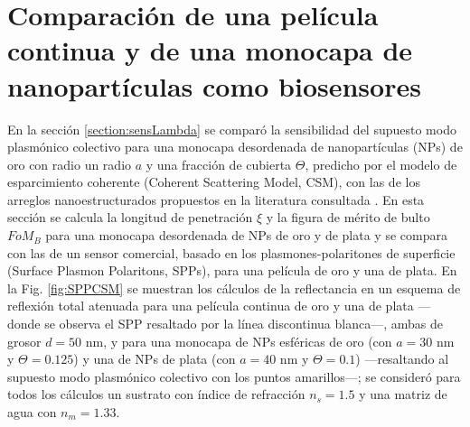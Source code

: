 \chapter{Comparación de una película continua y de una monocapa de nanopartículas como biosensores}

\label{section:A1}

En la sección \ref{section:sensLambda} se comparó la sensibilidad del supuesto modo plasmónico colectivo para una monocapa desordenada de nanopartículas (NPs) de oro con radio un radio $a$ y una fracción de cubierta $\Theta$, predicho por el modelo de esparcimiento coherente (Coherent Scattering Model, CSM), con las de los arreglos nanoestructurados propuestos en la literatura consultada \cite{danilov2018ultra,svedendahl2009refractometric}. En esta sección se calcula  la longitud de penetración $\xi$ y la figura de mérito de bulto $\textit{FoM}_B$ para una monocapa desordenada de NPs  de oro y de plata y se compara con las de un sensor comercial, basado en los plasmones-polaritones de superficie (Surface Plasmon Polaritons, SPPs), para una película de oro y una de plata. En la Fig. \ref{fig:SPPCSM} se muestran los cálculos de la reflectancia en un esquema de reflexión total atenuada para una película continua de oro y una de plata ---donde se observa el SPP resaltado por la línea discontinua blanca---, ambas de grosor $d=50$ nm, y para una monocapa de NPs esféricas de oro (con $a=30$ nm y $\Theta=0.125$) y una de NPs de plata (con $a=40$ nm y $\Theta=0.1$) ---resaltando al supuesto modo  plasmónico colectivo con los puntos amarillos---; se consideró para todos los cálculos un sustrato con índice de refracción $n_s=1.5$ y una matriz de agua con $n_m=1.33$.

